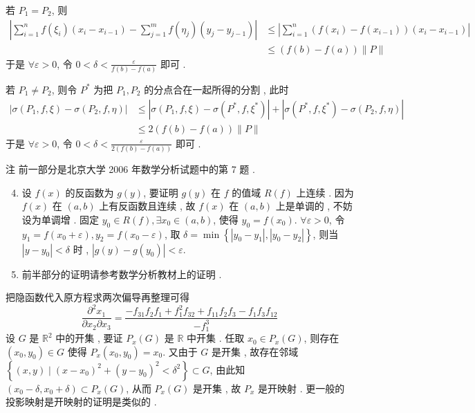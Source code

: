\documentclass[10pt]{article}
\begin{document}
 若  $P_{1}=P_{2}$,  则 
$$
\begin{aligned}
\left|\sum_{i=1}^{n} f\left(\xi_{i}\right)\left(x_{i}-x_{i-1}\right)-\sum_{j=1}^{m} f\left(\eta_{j}\right)\left(y_{j}-y_{j-1}\right)\right| & \leqslant\left|\sum_{i=1}^{n}\left(f\left(x_{i}\right)-f\left(x_{i-1}\right)\right)\left(x_{i}-x_{i-1}\right)\right| \\
& \leqslant(f(b)-f(a))\|P\|
\end{aligned}
$$
 于是  $\forall \varepsilon>0$,  令  $0<\delta<\frac{\varepsilon}{f(b)-f(a)}$  即可 .

 若  $P_{1} \neq P_{2}$,  则令  $P^{*}$  为把  $P_{1}, P_{2}$  的分点合在一起所得的分割 ,  此时 
$$
\begin{aligned}
\left|\sigma\left(P_{1}, f, \xi\right)-\sigma\left(P_{2}, f, \eta\right)\right| & \leqslant\left|\sigma\left(P_{1}, f, \xi\right)-\sigma\left(P^{*}, f, \xi^{*}\right)\right|+\left|\sigma\left(P^{*}, f, \xi^{*}\right)-\sigma\left(P_{2}, f, \eta\right)\right| \\
& \leqslant 2(f(b)-f(a))\|P\|
\end{aligned}
$$
 于是  $\forall \varepsilon>0$,  令  $0<\delta<\frac{\varepsilon}{2(f(b)-f(a))}$  即可 .

 注   前一部分是北京大学  2006  年数学分析试题中的第  7  题 .

\begin{enumerate}
  \setcounter{enumi}{3}
  \item  设  $f(x)$  的反函数为  $g(y)$,  要证明  $g(y)$  在  $f$  的值域  $R(f)$  上连续 .  因为  $f(x)$  在  $(a, b)$  上有反函数且连续 ,  故  $f(x)$  在  $(a, b)$  上是单调的 ,  不妨设为单调增 .  固定  $y_{0} \in R(f), \exists x_{0} \in(a, b)$,  使得  $y_{0}=f\left(x_{0}\right)$. $\forall \varepsilon>0$,  令  $y_{1}=f\left(x_{0}+\varepsilon\right), y_{2}=f\left(x_{0}-\varepsilon\right)$,  取  $\delta=\min \left\{\left|y_{0}-y_{1}\right|,\left|y_{0}-y_{2}\right|\right\}$,  则当  $\left|y-y_{0}\right|<\delta$  时 , $\left|g(y)-g\left(y_{0}\right)\right|<\varepsilon$.

  \item  前半部分的证明请参考数学分析教材上的证明 .

\end{enumerate}
 把隐函数代入原方程求两次偏导再整理可得 
$$
\frac{\partial^{2} x_{1}}{\partial x_{2} \partial x_{3}}=\frac{-f_{31} f_{2} f_{1}+f_{1}^{2} f_{32}+f_{11} f_{2} f_{3}-f_{1} f_{3} f_{12}}{-f_{1}^{3}}
$$
 设  $G$  是  $\mathbb{R}^{2}$  中的开集 ,  要证  $P_{x}(G)$  是  $\mathbb{R}$  中开集 .  任取  $x_{0} \in P_{x}(G)$,  则存在  $\left(x_{0}, y_{0}\right) \in G$  使得  $P_{x}\left(x_{0}, y_{0}\right)=x_{0}$.  又由于  $G$  是开集 ,  故存在邻域  $\left\{(x, y) \mid\left(x-x_{0}\right)^{2}+\left(y-y_{0}\right)^{2}<\delta^{2}\right\} \subset G$,  由此知  $\left(x_{0}-\delta, x_{0}+\delta\right) \subset P_{x}(G)$,  从而  $P_{x}(G)$  是开集 ,  故  $P_{x}$  是开映射 .  更一般的投影映射是开映射的证明是类似的 .
\end{document}
